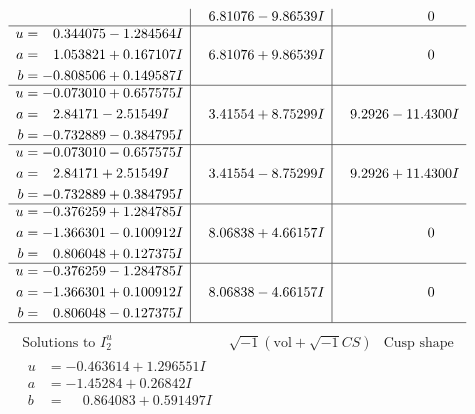\documentclass[1p]{elsarticle_modified}
\theoremstyle{definition}
\newcommand{\I}{\sqrt{-1}}
\begin{document}
$$\begin{array}{c|c|c}
 & \phantom{-}6.81076 - 9.86539 I & \phantom{-0.000000 } 0 \\ \hline\begin{aligned}
u &= \phantom{-}0.344075 - 1.284564 I \\
a &= \phantom{-}1.053821 + 0.167107 I \\
b &= -0.808506 + 0.149587 I\end{aligned}
 & \phantom{-}6.81076 + 9.86539 I & \phantom{-0.000000 } 0 \\ \hline\begin{aligned}
u &= -0.073010 + 0.657575 I \\
a &= \phantom{-}2.84171 - 2.51549 I \\
b &= -0.732889 - 0.384795 I\end{aligned}
 & \phantom{-}3.41554 + 8.75299 I & \phantom{-}9.2926 - 11.4300 I \\ \hline\begin{aligned}
u &= -0.073010 - 0.657575 I \\
a &= \phantom{-}2.84171 + 2.51549 I \\
b &= -0.732889 + 0.384795 I\end{aligned}
 & \phantom{-}3.41554 - 8.75299 I & \phantom{-}9.2926 + 11.4300 I \\ \hline\begin{aligned}
u &= -0.376259 + 1.284785 I \\
a &= -1.366301 - 0.100912 I \\
b &= \phantom{-}0.806048 + 0.127375 I\end{aligned}
 & \phantom{-}8.06838 + 4.66157 I & \phantom{-0.000000 } 0 \\ \hline\begin{aligned}
u &= -0.376259 - 1.284785 I \\
a &= -1.366301 + 0.100912 I \\
b &= \phantom{-}0.806048 - 0.127375 I\end{aligned}
 & \phantom{-}8.06838 - 4.66157 I & \phantom{-0.000000 } 0\\
 \hline 
 \end{array}$$\newpage$$\begin{array}{c|c|c}  
\text{Solutions to }I^u_{2}& \I (\text{vol} + \sqrt{-1}CS) & \text{Cusp shape}\\
 \hline 
\begin{aligned}
u &= -0.463614 + 1.296551 I \\
a &= -1.45284 + 0.26842 I \\
b &= \phantom{-}0.864083 + 0.591497 I\end{aligned}

\end{array}$$
\end{document}
